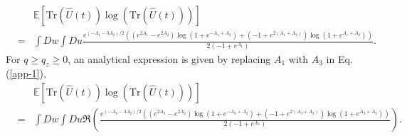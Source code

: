 \documentclass[
aps,
pre,
showpacs
]{revtex4-1}
\newcommand{\be}{\begin{eqnarray}}
\newcommand{\ee}{\end{eqnarray}}
\newcommand{\no}{\nonumber}
\newcommand{\Tr}{\mbox{Tr} }
\begin{document}
\be
&&\mathbb{E} \left[ \Tr \left(\hat{U}(t)\right)\log\left( \Tr \left(\hat{U}(t)\right) \right) \right] 
\no\\
&=& \int Dw \int Du\frac{e^{(-A_1-3A_2)/2}\left( (e^{2A_1}-e^{2A_2})\log(1+e^{-A_1+A_2}) +(-1+e^{2(A_1+A_2)}) \log(1+e^{A_1+A_2}) \right)}{2(-1+e^{A_1})}  .\label{app-1}
\ee
For $q\ge q_z \ge 0$, an analytical expression is given by replacing $A_1$ with $A_3$ in Eq. (\ref{app-1}),
\be
&&\mathbb{E} \left[ \Tr \left(\hat{U}(t)\right)\log\left( \Tr \left(\hat{U}(t)\right) \right) \right] 
\no\\
&=& \int Dw \int Du \Re\left(\frac{e^{(-A_3-3A_2)/2}\left( (e^{2A_3}-e^{2A_2})\log(1+e^{-A_3+A_2}) +(-1+e^{2(A_3+A_2)}) \log(1+e^{A_3+A_2}) \right)}{2(-1+e^{A_3})}  \right).
\ee


\end{document}
